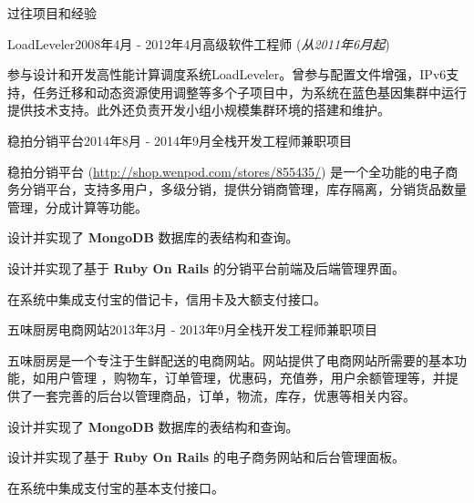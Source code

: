 \documentclass{resume} %
\newcommand{\http}{http:/\hspace{-0.3ex}/}
\newcommand{\kaiti}{\CJKfamily{kaiti}}
\begin{document}
\begin{rSection}{\kaiti 过往项目和经验}
\begin{rSubsection}{LoadLeveler}{2008年4月 - 2012年4月}{高级软件工程师 (\textit{从2011年6月起})}{}

参与设计和开发高性能计算调度系统LoadLeveler。曾参与配置文件增强，IPv6支持，任务迁移和动态资源使用调整等多个子项目中，为系统在蓝色基因集群中运行提供技术支持。此外还负责开发小组小规模集群环境的搭建和维护。

\end{rSubsection}



\begin{rSubsection}{稳拍分销平台}{2014年8月 - 2014年9月}{全栈开发工程师}{兼职项目}

稳拍分销平台 (\href{http://shop.wenpod.com/stores/855435/}{\http{}shop.wenpod.com/stores/855435/}) 是一个全功能的电子商务分销平台，支持多用户，多级分销，提供分销商管理，库存隔离，分销货品数量管理，分成计算等功能。

\begin{rSubsectionList}
\item 设计并实现了 \textbf{MongoDB} 数据库的表结构和查询。
\item 设计并实现了基于 \textbf{Ruby On Rails} 的分销平台前端及后端管理界面。
\item 在系统中集成支付宝的借记卡，信用卡及大额支付接口。
\end{rSubsectionList}
\end{rSubsection}



\begin{rSubsection}{五味厨房电商网站}{2013年3月 - 2013年9月}{全栈开发工程师}{兼职项目}

五味厨房是一个专注于生鲜配送的电商网站。网站提供了电商网站所需要的基本功能，如用户管理 ，购物车，订单管理，优惠码，充值券，用户余额管理等，并提供了一套完善的后台以管理商品，订单，物流，库存，优惠等相关内容。

\begin{rSubsectionList}
\item 设计并实现了 \textbf{MongoDB} 数据库的表结构和查询。
\item 设计并实现了基于 \textbf{Ruby On Rails} 的电子商务网站和后台管理面板。
\item 在系统中集成支付宝的基本支付接口。
\end{rSubsectionList}
\end{rSubsection}

\end{rSection}
\end{document}
